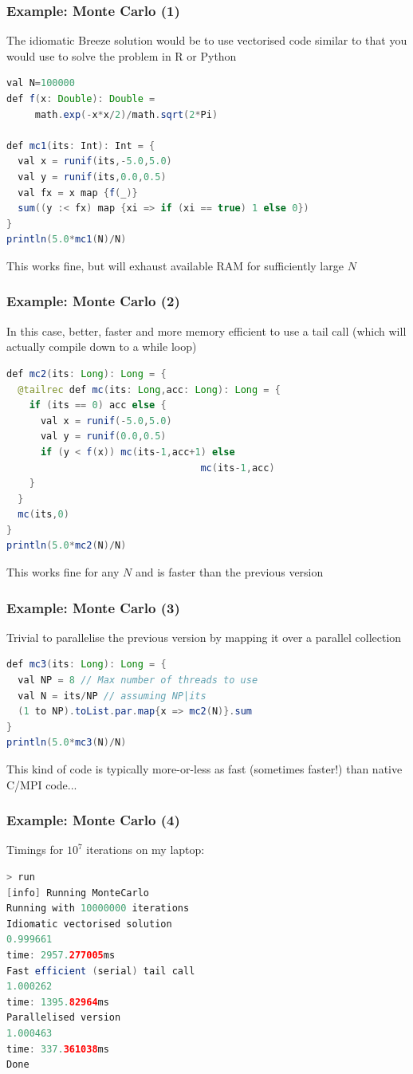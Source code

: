 \documentclass[mathserif,handout]{beamer}
\begin{document}
\begin{frame}[fragile]
\frametitle{Example: Monte Carlo (1)}
The idiomatic Breeze solution would be to use vectorised code similar to that you would use to solve the problem in R or Python
{\small
\begin{lstlisting}[language=java]
val N=100000
def f(x: Double): Double = 
     math.exp(-x*x/2)/math.sqrt(2*Pi)

def mc1(its: Int): Int = {
  val x = runif(its,-5.0,5.0)
  val y = runif(its,0.0,0.5)
  val fx = x map {f(_)}
  sum((y :< fx) map {xi => if (xi == true) 1 else 0})
}
println(5.0*mc1(N)/N)
\end{lstlisting}}
This works fine, but will exhaust available RAM for sufficiently large $N$
\end{frame}

\begin{frame}[fragile]
\frametitle{Example: Monte Carlo (2)}
In this case, better, faster and more memory efficient to use a tail call (which will actually compile down to a while loop)
{\small
\begin{lstlisting}[language=java]
def mc2(its: Long): Long = {
  @tailrec def mc(its: Long,acc: Long): Long = {
    if (its == 0) acc else {
      val x = runif(-5.0,5.0)
      val y = runif(0.0,0.5)
      if (y < f(x)) mc(its-1,acc+1) else 
                                  mc(its-1,acc)
    }  
  }
  mc(its,0)
}
println(5.0*mc2(N)/N)
\end{lstlisting}}
This works fine for any $N$ and is faster than the previous version
\end{frame}

\begin{frame}[fragile]
\frametitle{Example: Monte Carlo (3)}
Trivial to parallelise the previous version by mapping it over a parallel collection
{\small
\begin{lstlisting}[language=java]
def mc3(its: Long): Long = {
  val NP = 8 // Max number of threads to use
  val N = its/NP // assuming NP|its
  (1 to NP).toList.par.map{x => mc2(N)}.sum
}
println(5.0*mc3(N)/N)
\end{lstlisting}}
This kind of code is typically more-or-less as fast (sometimes faster!) than native C/MPI code...
\end{frame}

\begin{frame}[fragile]
\frametitle{Example: Monte Carlo (4)}
Timings for $10^7$ iterations on my laptop:
{\small
\begin{lstlisting}[language=java]
> run
[info] Running MonteCarlo 
Running with 10000000 iterations
Idiomatic vectorised solution
0.999661
time: 2957.277005ms
Fast efficient (serial) tail call
1.000262
time: 1395.82964ms
Parallelised version
1.000463
time: 337.361038ms
Done
\end{lstlisting}}
\end{frame}
\end{document}
